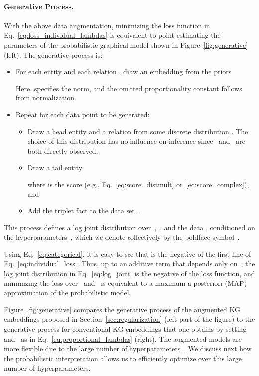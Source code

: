 \documentclass[letterpage]{article}
\begin{document}
\paragraph{Generative Process.}
With the above data augmentation, minimizing the loss function in Eq.~\ref{eq:loss_individual_lambdas} is equivalent to point estimating the parameters of the probabilistic graphical model shown in Figure~\ref{fig:generative} (left).
The generative process is:
\begin{itemize}
  \item
    For each entity  and each relation , draw an embedding  from the priors
    
    Here,  specifies the norm, and the omitted proportionality constant follows from normalization.
  \item
    Repeat for each data point to be generated:
    \begin{itemize}[topsep=-1pt,leftmargin=15pt]
      \item
        Draw a head entity  and a relation  from some discrete distribution .
        The choice of this distribution has no influence on inference since~ and~ are both directly observed.
      \item
        Draw a tail entity
        
        where  is the score (e.g., Eq.~\ref{eq:score_distmult} or~\ref{eq:score_complex}), and
        
      \item
        Add the triplet fact  to the data set~.
    \end{itemize}
\end{itemize}

This process defines a log joint distribution over~,~, and the data , conditioned on the hyperparameters~, which we denote collectively by the boldface symbol~,

Using Eq.~\ref{eq:categorical}, it is easy to see that  is the negative of the first line of Eq.~\ref{eq:individual_loss}.
Thus, up to an additive term that depends only on~, the log joint distribution in Eq.~\ref{eq:log_joint} is the negative of the loss function, and minimizing the loss over~ and~ is equivalent to a maximum a posteriori (MAP) approximation of the probabilistic model.

Figure~\ref{fig:generative} compares the generative process of the augmented KG embeddings proposed in Section~\ref{sec:regularization} (left part of the figure) to the generative process for conventional KG embeddings that one obtains by setting~ and~ as in Eq.~\ref{eq:proportional_lambdas} (right).
The augmented models are more flexible due to the large number of hyperparameters~.
We discuss next how the probabilistic interpretation allows us to efficiently optimize over this large number of hyperparameters.
\end{document}
